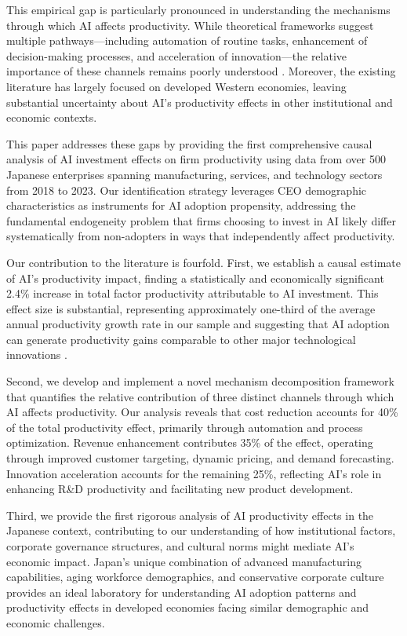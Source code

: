 \documentclass[12pt]{article}
\begin{document}
This empirical gap is particularly pronounced in understanding the mechanisms through which AI affects productivity. While theoretical frameworks suggest multiple pathways—including automation of routine tasks, enhancement of decision-making processes, and acceleration of innovation—the relative importance of these channels remains poorly understood \citep{brynjolfsson2019artificial, agrawal2018prediction}. Moreover, the existing literature has largely focused on developed Western economies, leaving substantial uncertainty about AI's productivity effects in other institutional and economic contexts.

This paper addresses these gaps by providing the first comprehensive causal analysis of AI investment effects on firm productivity using data from over 500 Japanese enterprises spanning manufacturing, services, and technology sectors from 2018 to 2023. Our identification strategy leverages CEO demographic characteristics as instruments for AI adoption propensity, addressing the fundamental endogeneity problem that firms choosing to invest in AI likely differ systematically from non-adopters in ways that independently affect productivity.

Our contribution to the literature is fourfold. First, we establish a causal estimate of AI's productivity impact, finding a statistically and economically significant 2.4\% increase in total factor productivity attributable to AI investment. This effect size is substantial, representing approximately one-third of the average annual productivity growth rate in our sample and suggesting that AI adoption can generate productivity gains comparable to other major technological innovations \citep{bresnahan1995general}.

Second, we develop and implement a novel mechanism decomposition framework that quantifies the relative contribution of three distinct channels through which AI affects productivity. Our analysis reveals that cost reduction accounts for 40\% of the total productivity effect, primarily through automation and process optimization. Revenue enhancement contributes 35\% of the effect, operating through improved customer targeting, dynamic pricing, and demand forecasting. Innovation acceleration accounts for the remaining 25\%, reflecting AI's role in enhancing R\&D productivity and facilitating new product development.

Third, we provide the first rigorous analysis of AI productivity effects in the Japanese context, contributing to our understanding of how institutional factors, corporate governance structures, and cultural norms might mediate AI's economic impact. Japan's unique combination of advanced manufacturing capabilities, aging workforce demographics, and conservative corporate culture provides an ideal laboratory for understanding AI adoption patterns and productivity effects in developed economies facing similar demographic and economic challenges.
\end{document}
